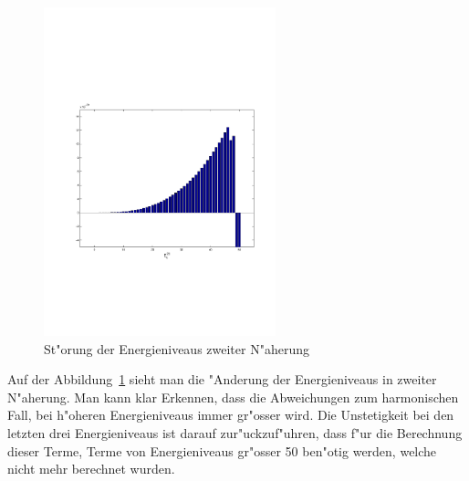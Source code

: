 \begin{refsection}
\begin{figure}	%
\centering
\includegraphics[width=0.6\textwidth]{anharmonisch/images/x4/EK2.pdf}
\caption{St"orung der Energieniveaus zweiter N"aherung
\label{skript:x4_EK2}}
\end{figure}

Auf der Abbildung~\ref{skript:x4_EK2} sieht man die "Anderung der Energieniveaus in zweiter N"aherung. Man kann klar Erkennen, dass die Abweichungen zum harmonischen Fall, bei h"oheren Energieniveaus immer gr"osser wird. Die Unstetigkeit bei den letzten drei Energieniveaus ist darauf zur"uckzuf"uhren, dass f"ur die Berechnung dieser Terme, Terme von Energieniveaus gr"osser 50 ben"otig werden, welche nicht mehr berechnet wurden.


\end{refsection}
